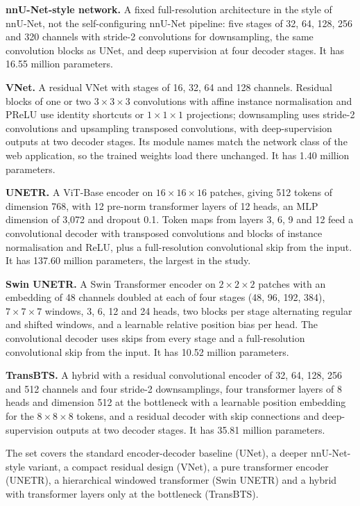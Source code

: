 \documentclass[a4paper,fleqn]{cas-sc}
\begin{document}
\textbf{nnU-Net-style network.} A fixed full-resolution architecture in the style of nnU-Net, not the self-configuring nnU-Net pipeline: five stages of 32, 64, 128, 256 and 320 channels with stride-2 convolutions for downsampling, the same convolution blocks as UNet, and deep supervision at four decoder stages. It has 16.55 million parameters.

\textbf{VNet.} A residual VNet with stages of 16, 32, 64 and 128 channels. Residual blocks of one or two $3\times 3\times 3$ convolutions with affine instance normalisation and PReLU use identity shortcuts or $1\times 1\times 1$ projections; downsampling uses stride-2 convolutions and upsampling transposed convolutions, with deep-supervision outputs at two decoder stages. Its module names match the network class of the web application, so the trained weights load there unchanged. It has 1.40 million parameters.

\textbf{UNETR.} A ViT-Base encoder on $16\times 16\times 16$ patches, giving 512 tokens of dimension 768, with 12 pre-norm transformer layers of 12 heads, an MLP dimension of 3,072 and dropout 0.1. Token maps from layers 3, 6, 9 and 12 feed a convolutional decoder with transposed convolutions and blocks of instance normalisation and ReLU, plus a full-resolution convolutional skip from the input. It has 137.60 million parameters, the largest in the study.

\textbf{Swin UNETR.} A Swin Transformer encoder on $2\times 2\times 2$ patches with an embedding of 48 channels doubled at each of four stages (48, 96, 192, 384), $7\times 7\times 7$ windows, 3, 6, 12 and 24 heads, two blocks per stage alternating regular and shifted windows, and a learnable relative position bias per head. The convolutional decoder uses skips from every stage and a full-resolution convolutional skip from the input. It has 10.52 million parameters.

\textbf{TransBTS.} A hybrid with a residual convolutional encoder of 32, 64, 128, 256 and 512 channels and four stride-2 downsamplings, four transformer layers of 8 heads and dimension 512 at the bottleneck with a learnable position embedding for the $8\times 8\times 8$ tokens, and a residual decoder with skip connections and deep-supervision outputs at two decoder stages. It has 35.81 million parameters.

The set covers the standard encoder-decoder baseline (UNet), a deeper nnU-Net-style variant, a compact residual design (VNet), a pure transformer encoder (UNETR), a hierarchical windowed transformer (Swin UNETR) and a hybrid with transformer layers only at the bottleneck (TransBTS).
\end{document}
